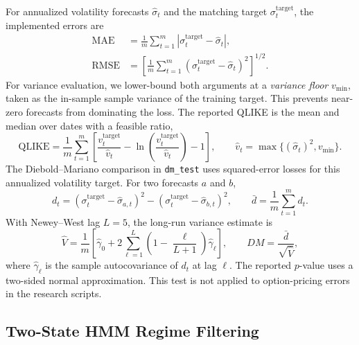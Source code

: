 \documentclass[journal]{IEEEtran}
\begin{document}
For annualized volatility forecasts $\widehat\sigma_t$ and the matching target $\sigma^{\mathrm{target}}_t$, the implemented errors are
\begin{equation}
\begin{aligned}
\mathrm{MAE}&=\frac{1}{m}\sum_{t=1}^{m}\left|\sigma^{\mathrm{target}}_t-\widehat\sigma_t\right|,\\
\mathrm{RMSE}&=\left[\frac{1}{m}\sum_{t=1}^{m}(\sigma^{\mathrm{target}}_t-\widehat\sigma_t)^2\right]^{1/2}.
\end{aligned}
\end{equation}
For variance evaluation, we lower-bound both arguments at a \emph{variance floor} $v_{\min}$, taken as the in-sample sample variance of the training target. This prevents near-zero forecasts from dominating the loss. The reported QLIKE is the mean and median over dates with a feasible ratio,
\begin{equation}
\mathrm{QLIKE}=\frac{1}{m}\sum_{t=1}^{m}\left[\frac{v^{\mathrm{target}}_t}{\widehat v_t}-\ln\left(\frac{v^{\mathrm{target}}_t}{\widehat v_t}\right)-1\right],
\qquad \widehat v_t=\max\{(\widehat\sigma_t)^2, v_{\min}\}.
\end{equation}
The Diebold--Mariano comparison in \texttt{dm\_test} uses squared-error losses for this annualized volatility target. For two forecasts $a$ and $b$,
\begin{equation}
d_t=(\sigma^{\mathrm{target}}_t-\widehat\sigma_{a,t})^2-(\sigma^{\mathrm{target}}_t-\widehat\sigma_{b,t})^2,
\qquad \bar d=\frac{1}{m}\sum_{t=1}^{m}d_t.
\end{equation}
With Newey--West lag $L=5$, the long-run variance estimate is
\begin{equation}
\widehat V=\frac{1}{m}\left[\widehat\gamma_0+2\sum_{\ell=1}^{L}\left(1-\frac{\ell}{L+1}\right)\widehat\gamma_\ell\right],
\qquad DM=\frac{\bar d}{\sqrt{\widehat V}},
\end{equation}
where $\widehat\gamma_\ell$ is the sample autocovariance of $d_t$ at lag $\ell$. The reported $p$-value uses a two-sided normal approximation. This test is not applied to option-pricing errors in the research scripts.

\subsection{Two-State HMM Regime Filtering}
\end{document}
